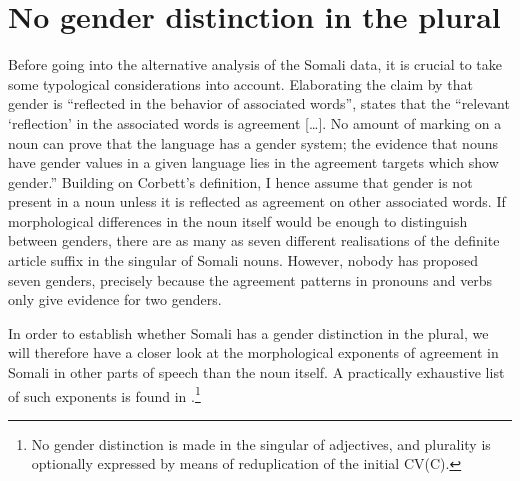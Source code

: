 \documentclass[output=paper]{langsci/langscibook}
\begin{document}
\section{No gender distinction in the plural}

Before going into the alternative analysis of the Somali data, it is crucial to take some typological considerations into account. Elaborating the claim by \citet[231]{Hockett1958} that gender is “reflected in the behavior of associated words”, \citet[89--90]{Corbett} states that the “relevant ‘reflection’ in the associated words is agreement […]. No amount of marking on a noun can prove that the language has a gender system; the evidence that nouns have gender values in a given language lies in the agreement targets which show gender.” Building on Corbett’s definition, I hence assume that gender is not present in a noun unless it is reflected as agreement on other associated words. If morphological differences in the noun itself would be enough to distinguish between genders, there are as many as seven different realisations of the definite article suffix in the singular of Somali nouns. However, nobody has proposed seven genders, precisely because the agreement patterns in pronouns and verbs only give evidence for two genders. 

In order to establish whether Somali has a gender distinction in the plural, we will therefore have a closer look at the morphological exponents of agreement in Somali in other parts of speech than the noun itself. A practically exhaustive list of such exponents is found in .\footnote{No gender distinction is made in the singular of adjectives, and plurality is optionally expressed by means of reduplication of the initial CV(C).}
\end{document}
